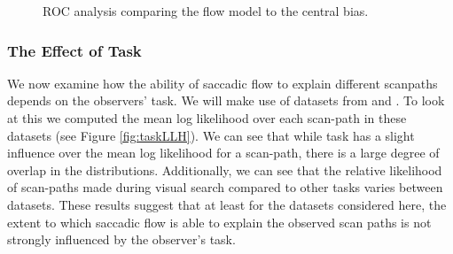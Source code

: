 \documentclass[a4paper, twocolumn, oneside, 11pt]{article}
\begin{document}
\begin{figure}
\centering
{}
\caption{ROC analysis comparing the flow model to the central bias.}
\label{fig:nFlowROC}
\end{figure}


\subsubsection{The Effect of Task}

We now examine how the ability of saccadic flow to explain different scanpaths depends on the observers' task. We will make use of datasets from \cite{mills2011} and \cite{koehler2014}. To look at this we computed the mean log likelihood over each scan-path in these datasets (see Figure \ref{fig:taskLLH}). We can see that while task has a slight influence over the mean log likelihood for a scan-path, there is a large degree of overlap in the distributions. Additionally, we can see that the relative likelihood of scan-paths made during visual search compared to other tasks varies between datasets. These results suggest that at least for the datasets considered here, the extent to which saccadic flow is able to explain the observed scan paths is not strongly influenced by the observer's task.
\end{document}
